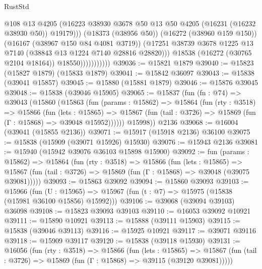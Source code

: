 \begin{lexlean}{RustStd}
\begin{coremodule}
                                @108
                                @13
                                @4205
                                (@16223
                                  @38930
                                  @3678
                                  @50
                                  @13
                                  @50
                                  @4205
                                  (@16231 (@16232 @38930 @50))
                                  @19179)))
                            (@18373 (@38956 @50))
                            (@16272 (@38960 @159 @150))
                            (@16167 (@38967 @150 @84 @4081 @3719))
                            (@17251
                              @38739
                              @3678
                              @1225
                              @13
                              @7140
                              (@38843 @13 @1224 @7140 @28816 @28820)))
                          @18538
                          (@16272 (@30765 @2104 @18164))
                          @18550)))))))))))
@39036 := @15821 @1879
@39040 := @15823 (@15827 @1879) (@15833 @1879)
@39041 := @15842 @36097
@39043 := @15838 (@39041 @15857)
@39045 := @15880 (@15881 @1879)
@39046 := @15876 @39045
@39048 := @15838 (@39046 @15905)
@39065 := @15837
    (fun (fn : @74) =>
    @39043
      (@15860
        (@15863
          (fun (params : @15862) =>
          @15864
            (fun (rty : @3518) =>
            @15866
              (fun (lets : @15865) =>
              @15867 (fun (tail : @3726) => @15869 (fun (Γ : @15868) => @39048 @15952))))))
        @15998))
    @2136
@39068 := @16004 (@39041 (@15855 @2136))
@39071 := @15917 (@15918 @2136) @36100
@39075 := @15838 (@15909 (@39071 @15926) @15930)
@39076 := @15943 @2136
@39081 := @15940 (@15942 @39076 @36103 @15898 @15900)
@39092 := fun (params : @15862) =>
  @15864
    (fun (rty : @3518) =>
    @15866
      (fun (lets : @15865) =>
      @15867 (fun (tail : @3726) => @15869 (fun (Γ : @15868) => @39048 (@39075 @39081)))))
@39093 := @15863 @39092
@39094 := @15860 @39093
@39103 := @15966
    (fun (U : @15965) => @15967 (fun (t : @7) => @15975 (@15838 (@15981 @36100 @15856) @15992)))
@39106 := @39068 (@39094 @39103) @36098
@39108 := @15823 @39093 @39103
@39110 := @16053 @39092 @10921
@39111 := @15890 @10921
@39113 := @15888 (@39111 @15903)
@39115 := @15838 (@39046 @39113)
@39116 := @15925 @10921
@39117 := @39071 @39116
@39118 := @15909 @39117
@39120 := @15838 (@39118 @15930)
@39131 := @16056
    (fun (rty : @3518) =>
    @15866
      (fun (lets : @15865) =>
      @15867 (fun (tail : @3726) => @15869 (fun (Γ : @15868) => @39115 (@39120 @39081)))))

\end{coremodule}
\end{lexlean}
